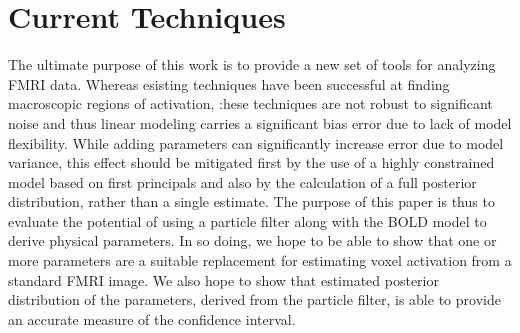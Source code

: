 
\chapter{Current Techniques}
The ultimate purpose of this work is to provide a new set of tools
for analyzing FMRI data. Whereas esisting techniques have been 
successful at finding macroscopic regions of activation, :hese
techniques are not robust to significant noise and thus linear 
modeling carries a significant bias error due to lack of model
flexibility. While adding parameters can significantly increase
error due to model variance, this effect should be mitigated first
by the use of a highly constrained model based on first principals
and also by the
calculation of a full posterior distribution, rather than a single
estimate. The
purpose of this paper is thus to evaluate the potential of using
a particle filter along with the BOLD model to derive physical 
parameters. In so doing, we hope to be able to show that one or more
parameters are a suitable replacement for estimating voxel 
activation from a standard FMRI image. We also hope to show that 
estimated posterior distribution of the parameters, derived from
the particle filter, is able to provide an accurate measure of the
confidence interval.

